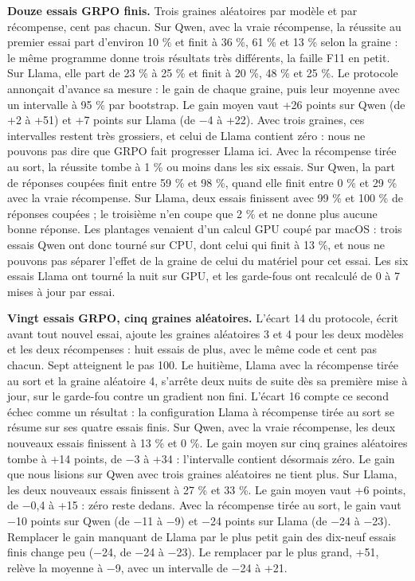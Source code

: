 \documentclass[11pt,a4paper]{article}
\begin{document}
\textbf{Douze essais GRPO finis.} Trois graines aléatoires par modèle et
par récompense, cent pas chacun. Sur Qwen, avec la vraie récompense, la
réussite au premier essai part d'environ 10 \% et finit à 36 \%, 61 \%
et 13 \% selon la graine : le même programme donne trois résultats très
différents, la faille F11 en petit. Sur Llama, elle part de 23 \% à 25
\% et finit à 20 \%, 48 \% et 25 \%. Le protocole annonçait d'avance sa
mesure : le gain de chaque graine, puis leur moyenne avec un intervalle
à 95 \% par bootstrap. Le gain moyen vaut +26 points sur Qwen (de +2 à
+51) et +7 points sur Llama (de −4 à +22). Avec trois graines, ces
intervalles restent très grossiers, et celui de Llama contient zéro :
nous ne pouvons pas dire que GRPO fait progresser Llama ici. Avec la
récompense tirée au sort, la réussite tombe à 1 \% ou moins dans les six
essais. Sur Qwen, la part de réponses coupées finit entre 59 \% et 98
\%, quand elle finit entre 0 \% et 29 \% avec la vraie récompense. Sur
Llama, deux essais finissent avec 99 \% et 100 \% de réponses coupées ;
le troisième n'en coupe que 2 \% et ne donne plus aucune bonne réponse.
Les plantages venaient d'un calcul GPU coupé par macOS : trois essais
Qwen ont donc tourné sur CPU, dont celui qui finit à 13 \%, et nous ne
pouvons pas séparer l'effet de la graine de celui du matériel pour cet
essai. Les six essais Llama ont tourné la nuit sur GPU, et les
garde-fous ont recalculé de 0 à 7 mises à jour par essai.

\textbf{Vingt essais GRPO, cinq graines aléatoires.} L'écart 14 du
protocole, écrit avant tout nouvel essai, ajoute les graines aléatoires
3 et 4 pour les deux modèles et les deux récompenses : huit essais de
plus, avec le même code et cent pas chacun. Sept atteignent le pas 100.
Le huitième, Llama avec la récompense tirée au sort et la graine
aléatoire 4, s'arrête deux nuits de suite dès sa première mise à jour,
sur le garde-fou contre un gradient non fini. L'écart 16 compte ce
second échec comme un résultat : la configuration Llama à récompense
tirée au sort se résume sur ses quatre essais finis. Sur Qwen, avec la
vraie récompense, les deux nouveaux essais finissent à 13 \% et 0 \%. Le
gain moyen sur cinq graines aléatoires tombe à +14 points, de −3 à +34 :
l'intervalle contient désormais zéro. Le gain que nous lisions sur Qwen
avec trois graines aléatoires ne tient plus. Sur Llama, les deux
nouveaux essais finissent à 27 \% et 33 \%. Le gain moyen vaut +6
points, de −0,4 à +15 : zéro reste dedans. Avec la récompense tirée au
sort, le gain vaut −10 points sur Qwen (de −11 à −9) et −24 points sur
Llama (de −24 à −23). Remplacer le gain manquant de Llama par le plus
petit gain des dix-neuf essais finis change peu (−24, de −24 à −23). Le
remplacer par le plus grand, +51, relève la moyenne à −9, avec un
intervalle de −24 à +21.
\end{document}
